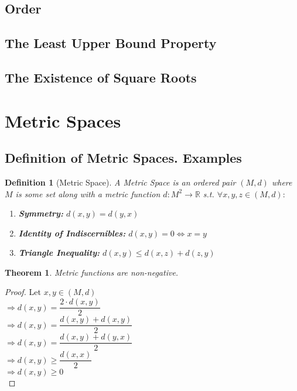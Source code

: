 \documentclass{article}
\newtheorem{definition}{Definition}[section]
\newtheorem{theorem}{Theorem}[section]
\begin{document}
		\subsection{Order}
		
		\subsection{The Least Upper Bound Property}
		
		\subsection{The Existence of Square Roots}

	
	\section{Metric Spaces}
		\subsection{Definition of Metric Spaces. Examples}
			\begin{definition}[Metric Space]
				A Metric Space is an ordered pair $(M, d)$ where $M$ is some set along with a metric function $d \colon M^2 \to \mathbb{R}$ s.t. $\forall x, y, z \in (M, d):$
				\begin{enumerate}
					\item \textbf{Symmetry:} $d(x, y) = d(y, x)$
					\item \textbf{Identity of Indiscernibles:} $d(x, y) = 0 \Leftrightarrow x=y$
					\item \textbf{Triangle Inequality:} $d(x, y) \leq d(x, z) + d(z, y)$
				\end{enumerate}
			\end{definition}
		
			\begin{theorem}
				Metric functions are non-negative.
			\end{theorem}
			\begin{proof}
				Let $x, y \in (M, d)$\\
				$\Rightarrow d(x, y) = \dfrac{2 \cdot d(x, y)}{2}$\\
				$\Rightarrow d(x, y) = \dfrac{d(x, y) + d(x, y)}{2}$\\
				$\Rightarrow d(x, y) = \dfrac{d(x, y) + d(y, x)}{2}$\\
				$\Rightarrow d(x, y) \geq \dfrac{d(x, x)}{2}$\\
				$\Rightarrow d(x, y) \geq 0$\\
			\end{proof}
\end{document}
